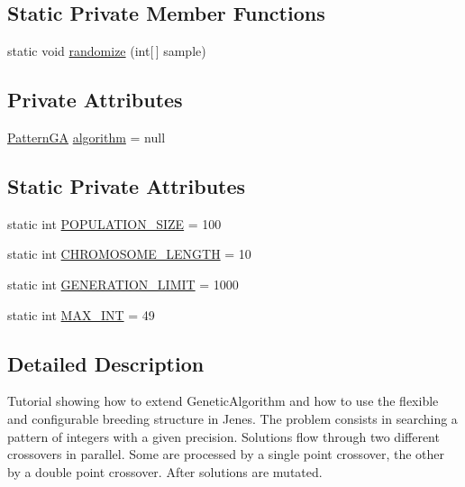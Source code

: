 \subsection*{Static Private Member Functions}
\begin{DoxyCompactItemize}
\item 
static void \hyperlink{classjenes_1_1tutorials_1_1old_1_1problem2_1_1_pattern_problem_a1c15761f2693f80cfc828d75e1071806}{randomize} (int\mbox{[}$\,$\mbox{]} sample)
\end{DoxyCompactItemize}
\subsection*{Private Attributes}
\begin{DoxyCompactItemize}
\item 
\hyperlink{classjenes_1_1tutorials_1_1old_1_1problem2_1_1_pattern_g_a}{Pattern\-G\-A} \hyperlink{classjenes_1_1tutorials_1_1old_1_1problem2_1_1_pattern_problem_a7033143ec3ab45a7ce7f49348dedcd72}{algorithm} = null
\end{DoxyCompactItemize}
\subsection*{Static Private Attributes}
\begin{DoxyCompactItemize}
\item 
static int \hyperlink{classjenes_1_1tutorials_1_1old_1_1problem2_1_1_pattern_problem_a5ce3446fd4df07d98f267959b4a8f8fe}{P\-O\-P\-U\-L\-A\-T\-I\-O\-N\-\_\-\-S\-I\-Z\-E} = 100
\item 
static int \hyperlink{classjenes_1_1tutorials_1_1old_1_1problem2_1_1_pattern_problem_af0787d7864f805de8202e637c1e6d4bc}{C\-H\-R\-O\-M\-O\-S\-O\-M\-E\-\_\-\-L\-E\-N\-G\-T\-H} = 10
\item 
static int \hyperlink{classjenes_1_1tutorials_1_1old_1_1problem2_1_1_pattern_problem_a9aa9b8206fdf983d1151499459a41443}{G\-E\-N\-E\-R\-A\-T\-I\-O\-N\-\_\-\-L\-I\-M\-I\-T} = 1000
\item 
static int \hyperlink{classjenes_1_1tutorials_1_1old_1_1problem2_1_1_pattern_problem_a770d0a2db36c45045074bd1503eeac37}{M\-A\-X\-\_\-\-I\-N\-T} = 49
\end{DoxyCompactItemize}


\subsection{Detailed Description}
Tutorial showing how to extend {\ttfamily Genetic\-Algorithm} and how to use the flexible and configurable breeding structure in Jenes. The problem consists in searching a pattern of integers with a given precision. Solutions flow through two different crossovers in parallel. Some are processed by a single point crossover, the other by a double point crossover. After solutions are mutated.

